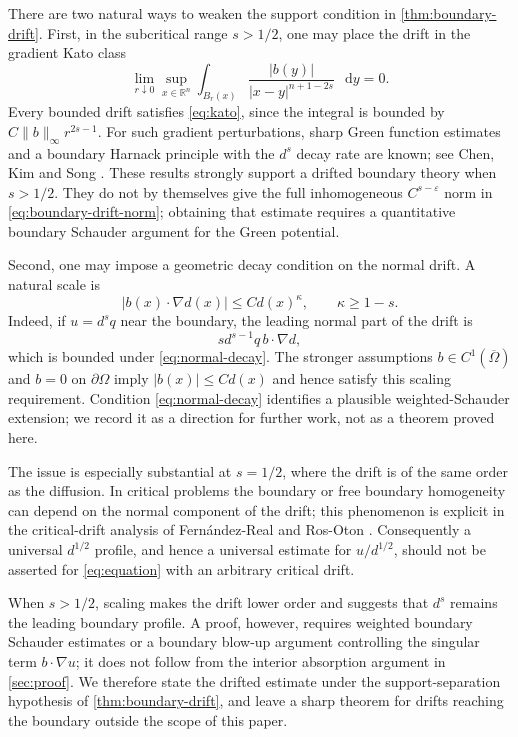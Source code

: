 \documentclass[reqno]{amsart}
\numberwithin{equation}{section}
\theoremstyle{plain}
\theoremstyle{definition}
\theoremstyle{remark}
\newcommand{\R}{\mathbb R}
\newcommand{\differential}{\mathop{}\!\mathrm d}
\begin{document}
There are two natural ways to weaken the support condition in
\cref{thm:boundary-drift}.  First, in the subcritical range $s>1/2$, one may
place the drift in the gradient Kato class
\begin{equation}\label{eq:kato}
 \lim_{r\downarrow0}\sup_{x\in\R^n}
 \int_{B_r(x)}
 \frac{|b(y)|}{|x-y|^{n+1-2s}}\,\differential y=0.
\end{equation}
Every bounded drift satisfies \eqref{eq:kato}, since the integral is bounded
by $C\|b\|_\infty r^{2s-1}$.  For such gradient perturbations, sharp Green
function estimates and a boundary Harnack principle with the $d^s$ decay
rate are known; see Chen, Kim and Song \cite{ChenKimSong2012}.  These results
strongly support a drifted boundary theory when $s>1/2$.  They do not by
themselves give the full inhomogeneous
$C^{s-\varepsilon}$ norm in \eqref{eq:boundary-drift-norm}; obtaining that
estimate requires a quantitative boundary Schauder argument for the Green
potential.

Second, one may impose a geometric decay condition on the normal drift.  A
natural scale is
\begin{equation}\label{eq:normal-decay}
 |b(x)\cdot\nabla d(x)|\le C d(x)^\kappa,
 \qquad \kappa\ge1-s.
\end{equation}
Indeed, if $u=d^sq$ near the boundary, the leading normal part of the drift
is
\[
 s d^{s-1}q\,b\cdot\nabla d,
\]
which is bounded under \eqref{eq:normal-decay}.  The stronger assumptions
$b\in C^1(\overline\Omega)$ and $b=0$ on $\partial\Omega$ imply
$|b(x)|\le C d(x)$ and hence satisfy this scaling requirement.  Condition
\eqref{eq:normal-decay} identifies a plausible weighted-Schauder extension;
we record it as a direction for further work, not as a theorem proved here.

The issue is especially substantial at $s=1/2$, where the drift is of the
same order as the diffusion.  In critical problems the boundary or free
boundary homogeneity can depend on the normal component of the drift; this
phenomenon is explicit in the critical-drift analysis of Fern\'andez-Real
and Ros-Oton \cite{FernandezRealRosOton2018}.  Consequently a universal
$d^{1/2}$ profile, and hence a universal estimate for $u/d^{1/2}$, should not
be asserted for \eqref{eq:equation} with an arbitrary critical drift.

When $s>1/2$, scaling makes the drift lower order and suggests that $d^s$
remains the leading boundary profile.  A proof, however, requires weighted
boundary Schauder estimates or a boundary blow-up argument controlling the
singular term $b\cdot\nabla u$; it does not follow from the interior
absorption argument in \cref{sec:proof}.  We therefore state
the drifted estimate under the support-separation hypothesis of
\cref{thm:boundary-drift}, and leave a sharp theorem for drifts reaching the
boundary outside the scope of this paper.
\end{document}
